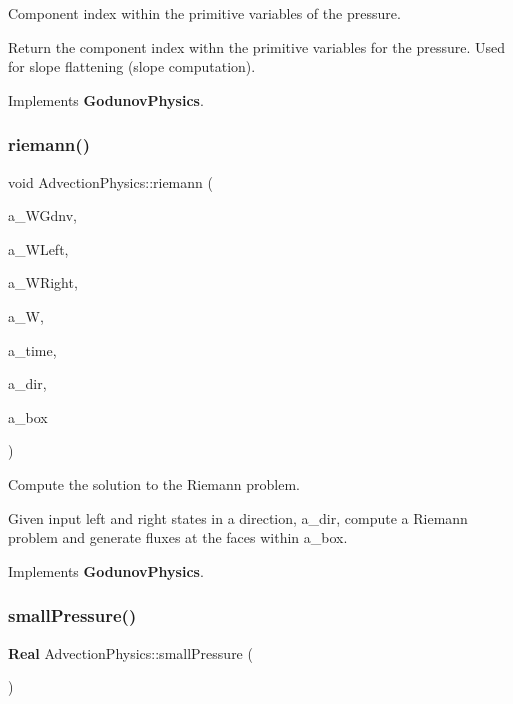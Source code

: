 Component index within the primitive variables of the pressure. 

Return the component index withn the primitive variables for the pressure. Used for slope flattening (slope computation). 

Implements \textbf{ Godunov\+Physics}.

\mbox{\label{class_advection_physics_aae156d1179d03c93022e39c9a378c120}} 
\subsubsection{\texorpdfstring{riemann()}{riemann()}}
{\footnotesize\ttfamily void Advection\+Physics\+::riemann (\begin{DoxyParamCaption}\item[{\textbf{ F\+Array\+Box} \&}]{a\+\_\+\+W\+Gdnv,  }\item[{const \textbf{ F\+Array\+Box} \&}]{a\+\_\+\+W\+Left,  }\item[{const \textbf{ F\+Array\+Box} \&}]{a\+\_\+\+W\+Right,  }\item[{const \textbf{ F\+Array\+Box} \&}]{a\+\_\+W,  }\item[{const \textbf{ Real} \&}]{a\+\_\+time,  }\item[{const int \&}]{a\+\_\+dir,  }\item[{const \textbf{ Box} \&}]{a\+\_\+box }\end{DoxyParamCaption})\hspace{0.3cm}{\ttfamily [virtual]}}



Compute the solution to the Riemann problem. 

Given input left and right states in a direction, a\+\_\+dir, compute a Riemann problem and generate fluxes at the faces within a\+\_\+box. 

Implements \textbf{ Godunov\+Physics}.

\mbox{\label{class_advection_physics_ae562469a45e542ceb2195ab8f3689db2}} 
\subsubsection{\texorpdfstring{small\+Pressure()}{smallPressure()}}
{\footnotesize\ttfamily \textbf{ Real} Advection\+Physics\+::small\+Pressure (\begin{DoxyParamCaption}{ }\end{DoxyParamCaption})\hspace{0.3cm}{\ttfamily [virtual]}}



